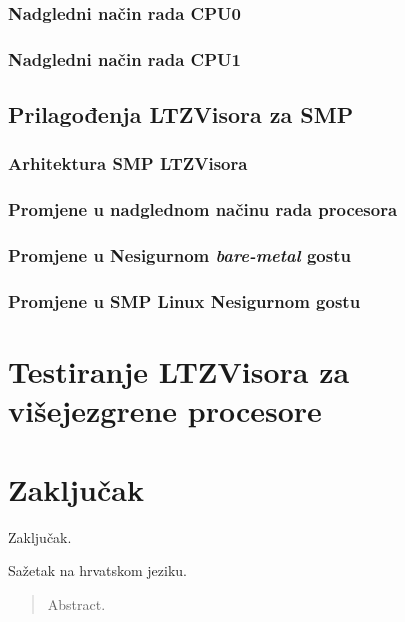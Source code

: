 \documentclass[times, utf8, diplomski, numeric]{fer}
\begin{document}
\subsection{Nadgledni način rada CPU0}
\subsection{Nadgledni način rada CPU1}
\section{Prilagođenja LTZVisora za SMP}
\subsection{Arhitektura SMP LTZVisora}
\subsection{Promjene u nadglednom načinu rada procesora}
\subsection{Promjene u Nesigurnom \textit{bare-metal} gostu}
\subsection{Promjene u SMP Linux Nesigurnom gostu}

\chapter{Testiranje LTZVisora za višejezgrene procesore}

\chapter{Zaključak}
Zaključak.




\begin{sazetak}
Sažetak na hrvatskom jeziku.

\end{sazetak}

\begin{abstract}
Abstract.

\end{abstract}
\end{document}
